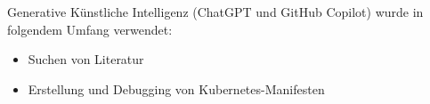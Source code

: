 \documentclass[11pt,a4paper]{article}
\begin{document}
Generative Künstliche Intelligenz (ChatGPT und GitHub Copilot) wurde in folgendem Umfang verwendet:
\begin{itemize}
  \item Suchen von Literatur
  \item Erstellung und Debugging von Kubernetes-Manifesten
\end{itemize}


\newpage
\printbibliography
\end{document}
